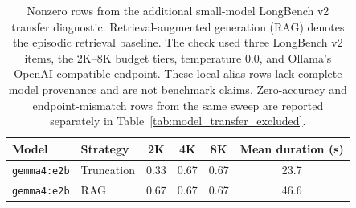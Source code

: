 \begin{table}[t]
\centering
\caption{Nonzero rows from the additional small-model LongBench v2 transfer diagnostic.  Retrieval-augmented generation (RAG) denotes the episodic retrieval baseline.  The check used three LongBench v2 items, the 2K--8K budget tiers, temperature 0.0, and Ollama's OpenAI-compatible endpoint.  These local alias rows lack complete model provenance and are not benchmark claims.  Zero-accuracy and endpoint-mismatch rows from the same sweep are reported separately in Table~\ref{tab:model_transfer_excluded}.}
\label{tab:model_transfer_gemma4}
\begin{tabular}{llcccc}
\toprule
Model & Strategy & 2K & 4K & 8K & Mean duration (s) \\
\midrule
\texttt{gemma4:e2b} & Truncation & 0.33 & 0.67 & 0.67 & 23.7 \\
\texttt{gemma4:e2b} & RAG & 0.67 & 0.67 & 0.67 & 46.6 \\
\bottomrule
\end{tabular}
\end{table}

\begin{table}[t]
\centering
\caption{Zero-accuracy and endpoint-mismatch rows from the additional small-model LongBench v2 transfer diagnostic.  Retrieval-augmented generation (RAG) denotes the episodic retrieval baseline.  All entries use three LongBench v2 items and report exact-match accuracy at 2K, 4K, and 8K.  These local alias rows lack complete model provenance and are not benchmark claims.}
\label{tab:model_transfer_excluded}
\end{table}

